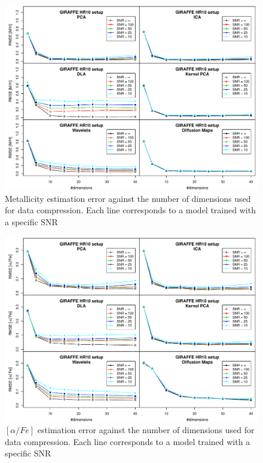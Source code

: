 \documentclass[a4paper,fleqn,usenatbib]{mnras}
\begin{document}
{\begin{figure}
\centering\includegraphics[width=\textwidth]{flamesHR10_Meta_log_BestSVM_N-SNR-RMSE_test.pdf}
\caption{Metallicity estimation error against the number of dimensions
  used for data compression. Each line corresponds to a model trained
  with a specific SNR}
\label{fig:methodsnrMeta}
\end{figure}

\begin{figure}
\centering\includegraphics[width=\textwidth]{flamesHR10_AlFe_log_BestSVM_N-SNR-RMSE_test.pdf}
\caption{$\left[ \alpha/Fe \right]$ estimation error against the number of dimensions
  used for data compression. Each line corresponds to a model trained
  with a specific SNR}
\label{fig:methodsnrAlpha}
\end{figure}

}
\end{document}
